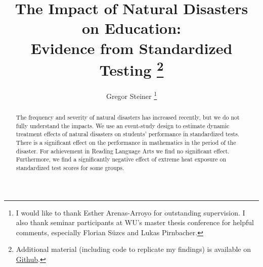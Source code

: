 \documentclass[11pt]{article}
\title{The Impact of Natural Disasters on Education: \\ Evidence from Standardized Testing \thanks{Additional material (including code to replicate my findings) is available on \href{https://github.com/gregorsteiner/MasterThesis}{Github}.}}
\author{Gregor Steiner \thanks{I would like to thank Esther Arenas-Arroyo for outstanding supervision. I also thank seminar participants at WU's master thesis conference for helpful comments, especially Florian Süzcs and Lukas Pirnbacher.}}
\begin{document}
\maketitle
{}

\begin{abstract}
	\centering
	\begin{minipage}{\dimexpr\paperwidth-10cm}
		The frequency and severity of natural disasters has increased recently, but we do not fully understand the impacts. We use an event-study design to estimate dynamic treatment effects of natural disasters on students' performance in standardized tests. There is a significant effect on the performance in mathematics in the period of the disaster. For achievement in Reading Language Arts we find no significant effect. Furthermore, we find a significantly negative effect of extreme heat exposure on standardized test scores for some groups.
	\end{minipage}
\end{abstract}

\newpage
\tableofcontents

\newpage












\appendix





\end{document}
